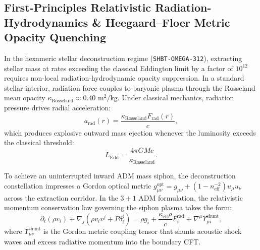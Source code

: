 \documentclass[11pt,onecolumn]{article}
\begin{document}
\subsection{First-Principles Relativistic Radiation-Hydrodynamics \& Heegaard--Floer Metric Opacity Quenching}
\label{sec:omega_stellar_deconstruct_hydro}

In the hexameric stellar deconstruction regime (\texttt{SHBT-OMEGA-312}), extracting stellar mass at rates exceeding the classical Eddington limit by a factor of $10^{12}$ requires non-local radiation-hydrodynamic opacity suppression. In a standard stellar interior, radiation force couples to baryonic plasma through the Rosseland mean opacity $\kappa_{\text{Rosseland}} \approx 0.40\text{ m}^2/\text{kg}$. Under classical mechanics, radiation pressure drives radial acceleration:
\begin{equation}
a_{\text{rad}}(r) = \frac{\kappa_{\text{Rosseland}} F_{\text{rad}}(r)}{c},
\end{equation}
which produces explosive outward mass ejection whenever the luminosity exceeds the classical threshold:
\begin{equation}
L_{\text{Edd}} = \frac{4\pi G M c}{\kappa_{\text{Rosseland}}}.
\end{equation}

To achieve an uninterrupted inward ADM mass siphon, the deconstruction constellation impresses a Gordon optical metric $g_{\mu\nu}^{\text{opt}} = g_{\mu\nu} + (1 - n_{\text{eff}}^{-2}) u_\mu u_\nu$ across the extraction corridor. In the $3+1$ ADM formulation, the relativistic momentum conservation law governing the siphon plasma takes the form:
\begin{equation}
\partial_t (\rho v_i) + \nabla_j \left( \rho v_i v^j + P \delta_i^j \right) = \rho g_i + \frac{\kappa_{\text{eff}} \rho}{c} F_i^{\text{rad}} + \nabla^\mu \Upsilon_{\mu i}^{\text{shunt}},
\label{eq:adm_siphon_momentum}
\end{equation}
where $\Upsilon_{\mu\nu}^{\text{shunt}}$ is the Gordon metric coupling tensor that shunts acoustic shock waves and excess radiative momentum into the boundary CFT.
\end{document}
